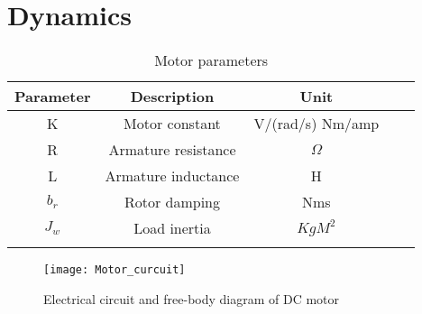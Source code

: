 {%




\section{Dynamics} \label{dc_math}

\begin{table}[h]
\centering
\begin{tabular}{cccll}
\hline
Parameter                   & Description                               & Unit				 &  &  \\ \hline
\multicolumn{1}{|c|}{K}     & \multicolumn{1}{c|}{Motor constant}       & \multicolumn{1}{c|}{ V/(rad/s)  Nm/amp} &  &  \\ \cline{1-3}
\multicolumn{1}{|c|}{R}     & \multicolumn{1}{c|}{Armature resistance}  & \multicolumn{1}{c|}{$\Omega$}            &  &  \\ \cline{1-3}
\multicolumn{1}{|c|}{L}     & \multicolumn{1}{c|}{Armature inductance}  & \multicolumn{1}{c|}{H}                    &  &  \\ \cline{1-3}
\multicolumn{1}{|c|}{$b_r$} & \multicolumn{1}{c|}{Rotor damping}        & \multicolumn{1}{c|}{Nms}                   &  &  \\ \cline{1-3}
\multicolumn{1}{|c|}{$J_w$} & \multicolumn{1}{c|}{Load inertia} & \multicolumn{1}{c|}{$KgM^2$}        &  &  \\ \cline{1-3}
\multicolumn{1}{l}{}        & \multicolumn{1}{l}{}                      & \multicolumn{1}{l}{}                          &  &  \\ \hline
\end{tabular}
\caption{Motor parameters}
\label{my-label}
\end{table}

\begin{figure}[h] %
\centering
\texttt{[image: Motor\_curcuit]}
\caption{Electrical circuit and free-body diagram of DC motor \cite{FBD}}
\label{fig::motor_curcuit}
\end{figure} 

}
